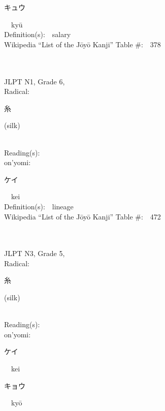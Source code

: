 \begin{multicols}{2}
{\hspace*{2em}}{\begin{CJK}{UTF8}{min} キュウ \end{CJK}}\ \ ky\=u\ \ \\
Definition(s):\ \ salary \\
Wikipedia ``List of the J\=oy\=o Kanji'' Table \#:\ \ 378 \\
\ \ \\
{\fontsize{34pt}{40pt}  }\ \ \\  %
{JLPT N1, Grade 6, \\Radical:\ \ {\begin{CJK}{UTF8}{min} 糸 \end{CJK}} (silk) } \\
Reading(s):\ \ \\
{\hspace*{1em}}on'yomi:\ \ \\
{\hspace*{2em}}{\begin{CJK}{UTF8}{min} ケイ \end{CJK}}\ \ kei\ \ \\
Definition(s):\ \ lineage \\
Wikipedia ``List of the J\=oy\=o Kanji'' Table \#:\ \ 472 \\
\ \ \\
{\fontsize{34pt}{40pt}  }\ \ \\  %
{JLPT N3, Grade 5, \\Radical:\ \ {\begin{CJK}{UTF8}{min} 糸 \end{CJK}} (silk) } \\
Reading(s):\ \ \\
{\hspace*{1em}}on'yomi:\ \ \\
{\hspace*{2em}}{\begin{CJK}{UTF8}{min} ケイ \end{CJK}}\ \ kei\ \ \\
{\hspace*{2em}}{\begin{CJK}{UTF8}{min} キョウ \end{CJK}}\ \ ky\=o\ \ \\

\end{multicols}
